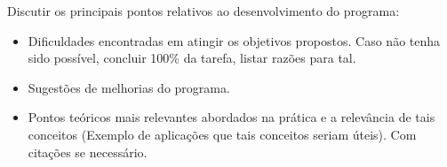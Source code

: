




Discutir os principais pontos relativos ao desenvolvimento do programa:

\begin{itemize}
	\item Dificuldades encontradas em atingir os objetivos propostos. Caso não tenha sido possível, concluir 100\% da tarefa, listar razões para tal.
	\item Sugestões de melhorias do programa.
	\item Pontos teóricos mais relevantes abordados na prática e a relevância de tais conceitos (Exemplo de aplicações que tais conceitos seriam úteis). Com citações  se necessário.
\end{itemize}


